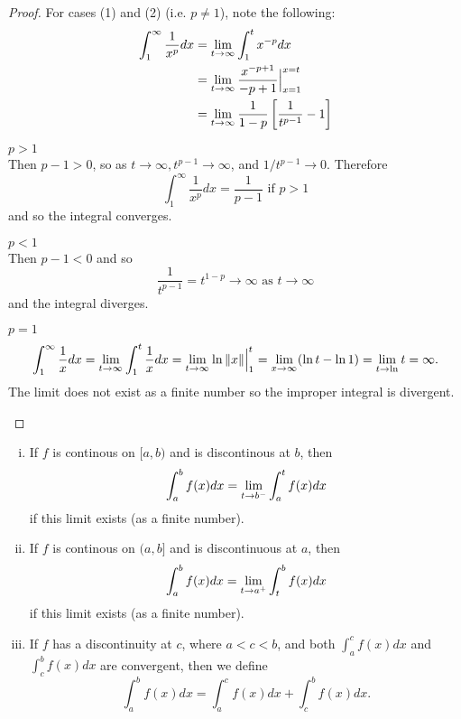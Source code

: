 \documentclass[a4paper,8pt]{article}
\begin{document}
\begin{outline}
    \begin{proof}
      For cases (1) and (2) (i.e. \(p \neq 1\)), note the following:
      \begin{align*}
        \int_1^{\infty}\frac{1}{x^p} dx &= \xlimit{t}{\infty}\int_1^tx^{-p} dx \\
                                        &= \xlimit{t}{\infty}\frac{x^{-p+1}}{-p+1}\Big\vert_{x=1}^{x=t} \\
                                        &= \xlimit{t}{\infty}\frac{1}{1-p}\left[\frac{1}{t^{p-1}}-1\right]
      \end{align*}
      \begin{proofcases}
        \item \(p > 1\)\\
          Then \(p-1 > 0\), so as \(t\rightarrow\infty, t^{p-1}\rightarrow\infty\), and \(1/t^{p-1}\rightarrow 0\).
          Therefore \[ \int_1^{\infty}\frac{1}{x^p}dx = \frac{1}{p-1}\text{ if }p > 1 \] and so the integral converges.
        \item \(p < 1\)\\
          Then \(p-1<0\) and so \[\frac{1}{t^{p-1}} = t^{1-p}\rightarrow\infty\text{ as }t\rightarrow\infty\] and
          the integral diverges.
        \item \(p = 1\)
          \[
            \int_1^{\infty}\frac{1}{x}dx = \xlimit{t}{\infty}\int_1^t\frac{1}{x}dx
                                         = \xlimit{t}{\infty}\ln{\norm{x}}\Big\vert_1^t
                                         = \xlimit{x}{\infty}(\ln{t}-\ln{1})
                                         = \xlimit{t}\ln{t} = \infty\text{.}
          \]
          The limit does not exist as a finite number so the improper integral is divergent.
      \end{proofcases}
    \end{proof}

    \begin{enumerate}[i.]
      \item
        If \(f\) is continous on \([a, b)\) and is discontinous at \(b\), then
        \[\int_a^{b}f(x)dx = \xlimit[-]{t}{b}\int_a^t f(x)dx\] if this limit exists (as a finite number).
      \item
        If \(f\) is continous on \((a, b]\) and is discontinuous at \(a\), then
        \[ \int_a^bf(x)dx = \xlimit[+]{t}{a}\int_t^bf(x)dx \] if this limit exists (as a finite number).

      \item
        If \(f\) has a discontinuity at \(c\), where \(a < c < b\), and both \(\int_a^cf(x)dx\) and
        \(\int_c^bf(x)dx\) are convergent, then we define \[\int_a^bf(x)dx = \int_a^cf(x)dx + \int_c^bf(x)dx\text{.}\]
    \end{enumerate}


\end{outline}
\end{document}
